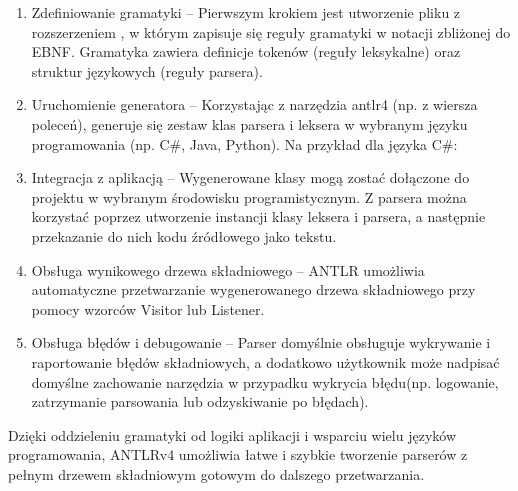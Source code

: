 \documentclass[12pt,twoside]{article}
\begin{document}
\begin{enumerate}[label=\arabic*., leftmargin=1.25cm]
\item 
Zdefiniowanie gramatyki -- Pierwszym krokiem jest utworzenie pliku z rozszerzeniem , w którym zapisuje się reguły gramatyki w notacji zbliżonej do EBNF. Gramatyka zawiera definicje tokenów (reguły leksykalne) oraz struktur językowych (reguły parsera).
\item Uruchomienie generatora -- Korzystając z narzędzia antlr4 (np. z wiersza poleceń), generuje się zestaw klas parsera i leksera w wybranym języku programowania (np. C\#, Java, Python). Na przykład dla języka C\#:\\
\item Integracja z aplikacją -- Wygenerowane klasy mogą zostać dołączone do projektu w wybranym środowisku programistycznym. Z parsera można korzystać poprzez utworzenie instancji klasy leksera i parsera, a następnie przekazanie do nich kodu źródłowego jako tekstu.
\item Obsługa wynikowego drzewa składniowego -- ANTLR umożliwia automatyczne przetwarzanie wygenerowanego drzewa składniowego przy pomocy wzorców Visitor lub Listener.
\item Obsługa błędów i debugowanie -- Parser domyślnie obsługuje wykrywanie i raportowanie błędów składniowych, a dodatkowo użytkownik może nadpisać domyślne zachowanie narzędzia w przypadku wykrycia błędu(np. logowanie, zatrzymanie parsowania lub odzyskiwanie po błędach).
\end{enumerate}

Dzięki oddzieleniu gramatyki od logiki aplikacji i wsparciu wielu języków programowania, ANTLRv4 umożliwia łatwe i szybkie tworzenie parserów z pełnym drzewem składniowym gotowym do dalszego przetwarzania.
\end{document}
